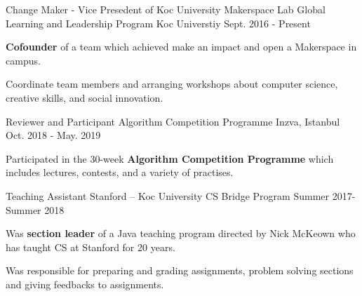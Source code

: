 \begin{cventries}
\vspace{-1mm}
  \cventry
    {Change Maker - Vice Presedent of Koc University Makerspace Lab} %
    {Global Learning and Leadership Program} %
    {Koc Universtiy} %
    {Sept. 2016 - Present} %
    {
      \begin{cvitems} %
        \item {\textbf{Cofounder} of a team which achieved make an impact and open a Makerspace in campus.}
        \item {Coordinate team members and arranging workshops about computer science, creative skills, and social innovation. }
      \end{cvitems}
    }
\vspace{-0.5mm}
  \cventry
    {Reviewer and Participant} %
    {Algorithm Competition Programme} %
    {Inzva, Istanbul} %
    {Oct. 2018 - May. 2019} %
    {
      \begin{cvitems} %
        \item {Participated in the 30-week \textbf{Algorithm Competition Programme} which includes lectures, contests, and a variety of practises.}
      \end{cvitems}
    }
\vspace{-0.5mm}
  \cventry
    {Teaching Assistant } %
    {Stanford – Koc University CS Bridge Program} %
    {} %
    {Summer 2017-Summer 2018} %
    {
      \begin{cvitems} %
        \item {Was \textbf{section leader} of a Java teaching program directed by Nick McKeown who has taught CS at Stanford for 20 years.}
        \item {Was responsible for preparing and grading assignments, problem solving sections and giving feedbacks to assignments.}
      \end{cvitems}
    }
\vspace{1mm}


\end{cventries}
